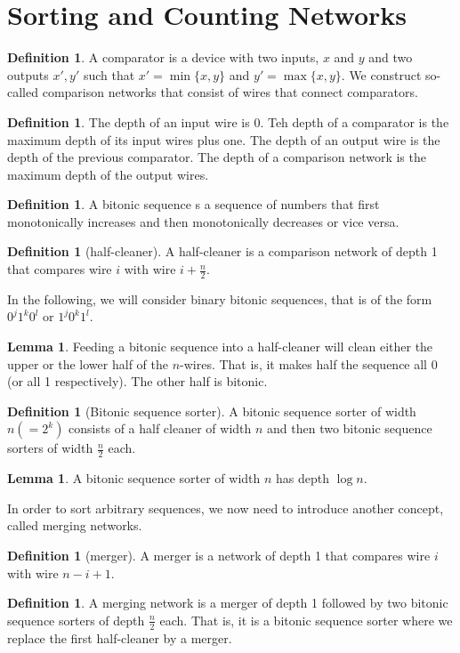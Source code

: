 \documentclass[a4paper, 12pt]{article}
\theoremstyle{plain}
\theoremstyle{definition}
\newtheorem{definition}[theorem]{Definition} %
\theoremstyle{lemma}
\newtheorem{lemma}[theorem]{Lemma}
\theoremstyle{remark}
\theoremstyle{corollary}
\theoremstyle{example}
\begin{document}
	\section{Sorting and Counting Networks}
	\begin{definition}
		A comparator is a device with two inputs, $x$ and $y$ and two outputs $x',y'$ such that $x'=\min\{x,y\}$ and $y'=\max\{x,y\}$. We construct so-called comparison networks that consist of wires that connect comparators.
	\end{definition}
	\begin{definition}
		The depth of an input wire is 0. Teh depth of a comparator is the maximum depth of its input wires plus one. The depth of an output wire is the depth of the previous comparator. The depth of a comparison network is the maximum depth of the output wires.
	\end{definition}
	\begin{definition}
		A bitonic sequence s a sequence of numbers that first monotonically increases and then monotonically decreases or vice versa.
	\end{definition}
	\begin{definition}[half-cleaner]
		A half-cleaner is a comparison network of depth 1 that compares wire $i$ with wire $i+\frac{n}{2}$.
	\end{definition}
	In the following, we will consider binary bitonic sequences, that is of the form $0^j1^k0^l$ or $1^j0^k1^l$.
	\begin{lemma}
		Feeding a bitonic sequence into a half-cleaner will clean either the upper or the lower half of the $n$-wires. That is, it makes half the sequence all 0 (or all 1 respectively). The other half is bitonic.
	\end{lemma}
	\begin{definition}[Bitonic sequence sorter]
		A bitonic sequence sorter of width $n (=2^k)$ consists of a half cleaner of width $n$ and then two bitonic sequence sorters of width $\frac{n}{2}$ each.
	\end{definition}
	\begin{lemma}
		A bitonic sequence sorter of width $n$ has depth $\log n$.
	\end{lemma}
	In order to sort arbitrary sequences, we now need to introduce another concept, called merging networks.
	\begin{definition}[merger]
		A merger is a network of depth 1 that compares wire $i$ with wire $n-i+1$.
	\end{definition}
	\begin{definition}
		A merging network is a merger of depth 1 followed by two bitonic sequence sorters of depth $\frac{n}{2}$ each. That is, it is a bitonic sequence sorter where we replace the first half-cleaner by a merger.
	\end{definition}
\end{document}
